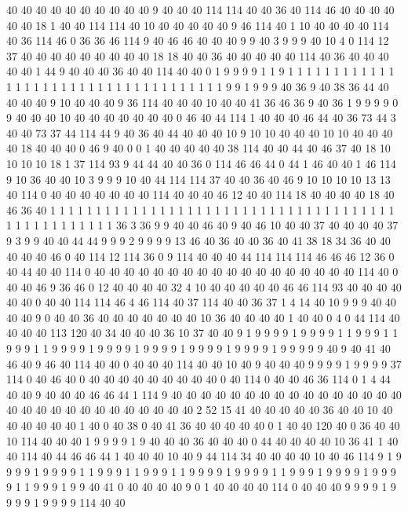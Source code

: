 40 40 40 40 40 40 40 40 40 40 9 40 40 40 114 114 40 40 36 40
114 46 40 40 40 40 40 40 18 1 40 40 114 114 40 10 40 40 40 40
40 9 46 114 40 1 10 40 40 40 40 114 40 36 114 46 0 36 36 46
114 9 40 46 46 40 40 40 9 9 40 3 9 9 9 40 10 4 0 114
12 37 40 40 40 40 40 40 40 40 40 18 18 40 40 36 40 40 40 40
40 114 40 36 40 40 40 40 40 1 44 9 40 40 40 36 40 40 114 40
40 0 1 9 9 9 9 1 1 9 1 1 1 1 1 1 1 1 1 1
1 1 1 1 1 1 1 1 1 1 1 1 1 1 1 1 1 1 1 1
1 1 1 1 1 1 9 9 1 9 9 9 40 36 9 40 38 36 44 40
40 40 40 9 10 40 40 40 9 36 114 40 40 40 10 40 40 41 36 46
36 9 40 36 1 9 9 9 9 0 9 40 40 40 10 40 40 40 40 40
40 40 0 46 40 44 114 1 40 40 40 46 44 40 36 73 44 3 40 40
73 37 44 114 44 9 40 36 40 44 40 40 40 10 9 10 10 40 40 40
10 10 40 40 40 40 18 40 40 40 0 46 9 40 0 0 1 40 40 40
40 40 38 114 40 40 44 40 46 37 40 18 10 10 10 10 18 1 37 114
93 9 44 44 40 40 36 0 114 46 46 44 0 44 1 46 40 40 1 46
114 9 10 36 40 40 10 3 9 9 9 10 40 44 114 114 37 40 40 36
40 46 9 10 10 10 10 13 13 40 114 0 40 40 40 40 40 40 40 114
40 40 40 46 12 40 40 114 18 40 40 40 40 18 40 46 36 40 1 1
1 1 1 1 1 1 1 1 1 1 1 1 1 1 1 1 1 1 1 1
1 1 1 1 1 1 1 1 1 1 1 1 1 1 1 1 1 1 1 1
1 1 1 1 1 1 1 1 36 3 36 9 9 40 40 46 40 9 40 46
10 40 40 37 40 40 40 40 37 9 3 9 9 40 40 44 44 9 9 9
2 9 9 9 9 13 46 40 36 40 40 36 40 41 38 18 34 36 40 40
40 40 40 46 0 40 114 12 114 36 0 9 114 40 40 40 44 114 114 114
46 46 46 12 36 0 40 44 40 40 114 0 40 40 40 40 40 40 40 40
40 40 40 40 40 40 40 40 40 40 114 40 0 40 40 46 9 36 46 0
12 40 40 40 40 32 4 10 40 40 40 40 40 46 46 114 93 40 40 40
40 40 40 0 40 40 114 114 46 4 46 114 40 37 114 40 40 36 37 1
4 14 40 10 9 9 9 40 40 40 40 9 0 40 40 36 40 40 40 40
40 40 40 10 36 40 40 40 40 1 40 40 0 4 0 44 114 40 40 40
40 113 120 40 34 40 40 40 36 10 37 40 40 9 1 9 9 9 9 1
9 9 9 9 1 1 9 9 9 1 1 9 9 9 1 1 9 9 9 9
1 9 9 9 9 1 9 9 9 9 1 9 9 9 9 1 9 9 9 9
1 9 9 9 9 9 40 9 40 41 40 46 40 9 46 40 114 40 40 0
40 40 40 114 40 40 10 40 9 40 40 40 9 9 9 9 1 9 9 9
9 37 114 0 40 46 40 0 40 40 40 40 40 40 40 40 40 0 40 114
0 40 40 46 36 114 0 1 4 44 40 40 9 40 40 40 46 46 44 1
114 9 40 40 40 40 40 40 40 40 40 40 40 40 40 40 40 40 40 40
40 40 40 40 40 40 40 40 40 40 40 2 52 15 41 40 40 40 40 40
36 40 40 10 40 40 40 40 40 40 1 40 0 40 38 0 40 41 36 40
40 40 40 40 0 1 40 40 120 40 0 36 40 40 10 114 40 40 40 1
9 9 9 9 1 9 40 40 40 36 40 40 40 0 44 40 40 40 40 10
36 41 1 40 40 114 40 44 46 46 44 1 40 40 40 10 40 9 44 114
34 40 40 40 40 10 40 46 114 9 1 9 9 9 9 1 9 9 9 9
1 1 9 9 9 1 1 9 9 9 1 1 9 9 9 9 1 9 9 9
9 1 1 9 9 9 1 9 9 9 9 1 9 9 9 9 1 1 9 9
9 1 9 9 40 41 0 40 40 40 40 9 0 1 40 40 40 40 114 0
40 40 40 9 9 9 9 1 9 9 9 9 1 9 9 9 9 114 40 40
